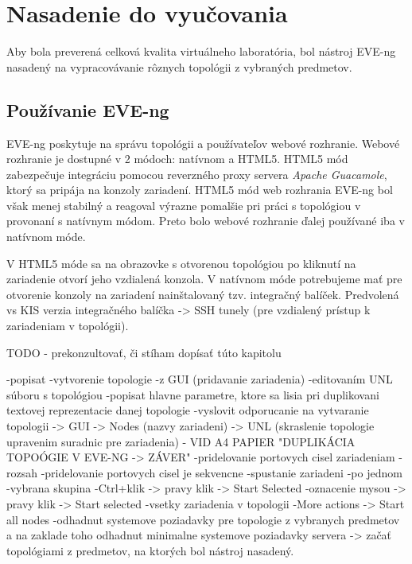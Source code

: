 \chapter{Nasadenie do vyučovania}
\label{chap:nasadenie_do_vyucovania}

Aby bola preverená celková kvalita virtuálneho laboratória, bol nástroj EVE-ng nasadený na vypracovávanie rôznych topológii z vybraných predmetov. 




\section{Používanie EVE-ng}
\label{chap:pouzivanie_eve_ng}

EVE-ng poskytuje na správu topológii a používateľov webové rozhranie. Webové rozhranie je dostupné v 2 módoch: natívnom a HTML5. HTML5 mód zabezpečuje integráciu pomocou reverzného proxy servera \emph{Apache Guacamole}, ktorý sa pripája na konzoly zariadení. HTML5 mód web rozhrania EVE-ng bol však menej stabilný a reagoval výrazne pomalšie pri práci s topológiou v provonaní s natívnym módom. Preto bolo webové rozhranie ďalej používané iba v natívnom móde.

V HTML5 móde sa na obrazovke s otvorenou topológiou po kliknutí na zariadenie otvorí jeho vzdialená konzola. V natívnom móde potrebujeme mať pre otvorenie konzoly na zariadení nainštalovaný tzv. integračný balíček. Predvolená vs KIS verzia integračného balíčka -> SSH tunely (pre vzdialený prístup k zariadeniam v topológii).


{\huge TODO - prekonzultovať, či stíham dopísať túto kapitolu}

-popisat
      -vytvorenie topologie
        -z GUI (pridavanie zariadenia)
        -editovaním UNL súboru s topológiou
            -popisat hlavne parametre, ktore sa lisia pri duplikovani textovej reprezentacie danej topologie
        -vyslovit odporucanie na vytvaranie topologii
            -> GUI -> Nodes (nazvy zariadeni) -> UNL (skraslenie topologie upravenim suradnic pre zariadenia) - VID A4 PAPIER "DUPLIKÁCIA TOPOÓGIE V EVE-NG -> ZÁVER"
      -pridelovanie portovych cisel zariadeniam
        -rozsah
        -pridelovanie portovych cisel je sekvencne
      -spustanie zariadeni
        -po jednom
        -vybrana skupina
          -Ctrl+klik -> pravy klik -> Start Selected
          -oznacenie mysou -> pravy klik -> Start selected
        -vsetky zariadenia v topologii
          -More actions -> Start all nodes
      -odhadnut systemove poziadavky pre topologie z vybranych predmetov a na zaklade toho odhadnut minimalne systemove poziadavky servera
      -> začať topológiami z predmetov, na ktorých bol nástroj nasadený.




